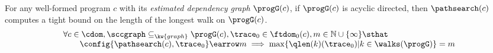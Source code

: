 \begin{thm}
  \label{thm:adaptalg_pcomplete}
  For any well-formed program $c$ with its \emph{estimated dependency graph} $\progG(c)$,
  if $\progG(c)$ is acyclic directed, then $\pathsearch(c)$ computes a tight bound 
  on the length of the longest walk on $\progG(c)$.
  \[
    \begin{array}{l}
      \forall c \in \cdom, \sccgraph \subseteq_{\kw{graph}} \progG(c),
    \trace_0 \in \ftdom_0(c), m \in \mathbb{N} \cup \{\infty\} \sthat
    \\ \qquad   
      \config{\pathsearch(c), \trace_0} \earrow m
      \implies
    \max\{\qlen(k)(\trace_0) | k \in \walks(\progG)\} = m
  \end{array}
  \]
\end{thm}
